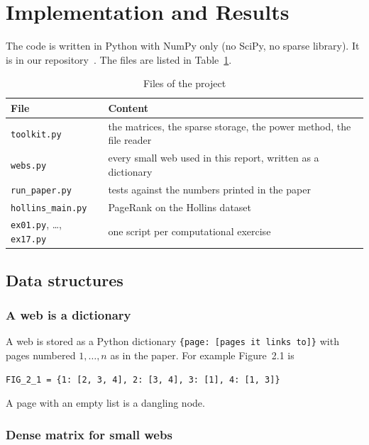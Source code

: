 \clearpage
\section{Implementation and Results}
\label{sec:implementation}

The code is written in Python with NumPy only (no SciPy, no sparse library).
It is in our repository~\cite{repo}. The files are listed in Table~\ref{tab:files}.

\begin{table}[H]\centering
\begin{tabular}{ll}
\toprule
\textbf{File} & \textbf{Content} \\
\midrule
\texttt{toolkit.py} & the matrices, the sparse storage, the power method, the file reader \\
\texttt{webs.py} & every small web used in this report, written as a dictionary \\
\texttt{run\_paper.py} & tests against the numbers printed in the paper \\
\texttt{hollins\_main.py} & PageRank on the Hollins dataset \\
\texttt{ex01.py}, \dots, \texttt{ex17.py} & one script per computational exercise \\
\bottomrule
\end{tabular}
\caption{Files of the project}
\label{tab:files}
\end{table}

\subsection{Data structures}

\subsubsection*{A web is a dictionary}

A web is stored as a Python dictionary \verb|{page: [pages it links to]}| with pages numbered $1,\dots,n$ as in the paper.
For example Figure~2.1 is
\begin{verbatim}
FIG_2_1 = {1: [2, 3, 4], 2: [3, 4], 3: [1], 4: [1, 3]}
\end{verbatim}
A page with an empty list is a dangling node.

\subsubsection*{Dense matrix for small webs}

